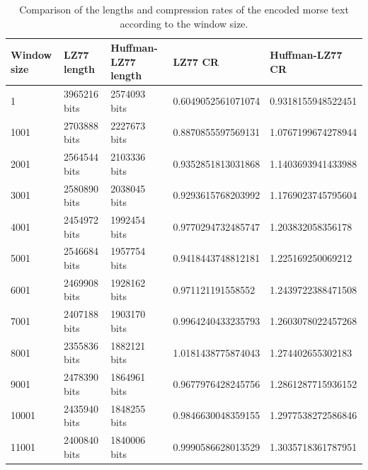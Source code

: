 \documentclass[a4paper, 11pt, oneside]{article}
\begin{document}
\begin{table}
    \begin{tabular}{|l|l|l|l|l|}
    \hline
    \textbf{Window size} & \textbf{LZ77 length} & \textbf{Huffman-LZ77 length} & \textbf{LZ77 CR} & \textbf{Huffman-LZ77 CR} \\ \hline
    1                    & 3965216 bits         & 2574093 bits                 & 0.6049052561071074             & 0.9318155948522451                     \\ \hline
    1001                 & 2703888 bits         & 2227673 bits                 & 0.8870855597569131             & 1.0767199674278944                     \\ \hline
    2001                 & 2564544 bits         & 2103336 bits                 & 0.9352851813031868             & 1.1403693941433988                     \\ \hline
    3001                 & 2580890 bits         & 2038045 bits                 & 0.9293615768203992             & 1.1769023745795604                     \\ \hline
    4001                 & 2454972 bits         & 1992454 bits                 & 0.9770294732485747             & 1.203832058356178                      \\ \hline
    5001                 & 2546684 bits         & 1957754 bits                 & 0.9418443748812181             & 1.225169250069212                      \\ \hline
    6001                 & 2469908 bits         & 1928162 bits                 & 0.971121191558552              & 1.2439722388471508                     \\ \hline
    7001                 & 2407188 bits         & 1903170 bits                 & 0.9964240433235793             & 1.2603078022457268                     \\ \hline
    8001                 & 2355836 bits         & 1882121 bits                 & 1.0181438775874043             & 1.274402655302183                      \\ \hline
    9001                 & 2478390 bits         & 1864961 bits                 & 0.9677976428245756             & 1.2861287715936152                     \\ \hline
    10001                & 2435940 bits         & 1848255 bits                 & 0.9846630048359155             & 1.2977538272586846                     \\ \hline
    11001                & 2400840 bits         & 1840006 bits                 & 0.9990586628013529             & 1.3035718361787951                     \\ \hline
    \end{tabular}
    \caption{Comparison of the lengths and compression rates of the encoded morse text according to the window size.}
    \label{table:comparison}
    \end{table}
    
\end{document}
